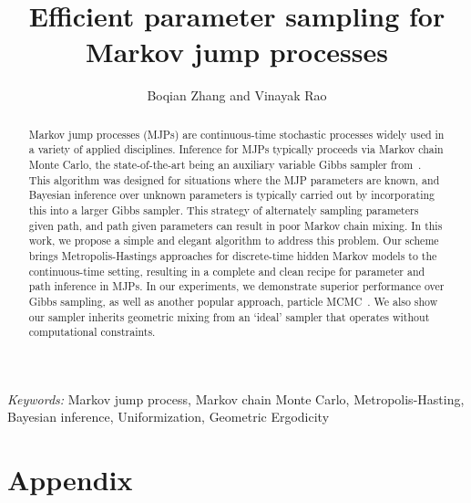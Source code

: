 \documentclass{statsoc}
\title[Efficient parameter sampling for MJPs]{\bf Efficient parameter sampling for Markov jump processes}
\author{Boqian Zhang and Vinayak Rao}
\begin{document}
\def\spacingset#1{\renewcommand{\baselinestretch}
{#1}\small\normalsize} \spacingset{1}



\begin{abstract}
Markov jump processes (MJPs) are continuous-time stochastic processes 
widely used in a variety of applied disciplines. Inference for MJPs typically
proceeds via Markov chain Monte Carlo, the state-of-the-art being an auxiliary
variable Gibbs sampler from~\cite{RaoTeh13}. This algorithm was
designed for situations where the MJP parameters are known, and Bayesian
inference over unknown parameters is typically carried out by incorporating
this into a larger Gibbs sampler.
This strategy of alternately sampling parameters given path, and
path given parameters can result in poor Markov chain mixing. In this
work, we propose a simple and elegant algorithm to address this
problem. Our scheme brings Metropolis-Hastings approaches
for discrete-time hidden Markov models to the continuous-time
setting, %
resulting in %
 a complete and clean recipe for
parameter and path inference in MJPs. In our experiments, we
demonstrate superior performance over Gibbs sampling, as well as
another popular approach, particle MCMC~\cite{Andrieu10}.
We also show our sampler inherits geometric mixing from an `ideal' 
sampler that operates without computational constraints.
\end{abstract}
\noindent%
{\it Keywords:}  Markov jump process, Markov chain Monte Carlo, Metropolis-Hasting, Bayesian
inference, Uniformization, Geometric Ergodicity
\vspace{-.05in}






%






\appendix
\section{Appendix}


%
\end{document}
